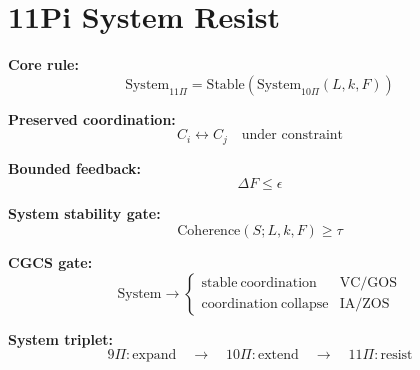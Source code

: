 \section*{11Pi System Resist}

\textbf{Core rule:}
\[
\mathrm{System}_{11\Pi}
=
\mathrm{Stable}\left(\mathrm{System}_{10\Pi}(L,k,F)\right)
\]

\textbf{Preserved coordination:}
\[
C_i \leftrightarrow C_j
\quad \text{under constraint}
\]

\textbf{Bounded feedback:}
\[
\Delta F \leq \epsilon
\]

\textbf{System stability gate:}
\[
\mathrm{Coherence}(S;L,k,F) \geq \tau
\]

\textbf{CGCS gate:}
\[
\mathrm{System} \rightarrow
\begin{cases}
\mathrm{stable\ coordination} & \text{VC/GOS} \\
\mathrm{coordination\ collapse} & \text{IA/ZOS}
\end{cases}
\]

\textbf{System triplet:}
\[
9\Pi:\mathrm{expand}
\quad\rightarrow\quad
10\Pi:\mathrm{extend}
\quad\rightarrow\quad
11\Pi:\mathrm{resist}
\]
